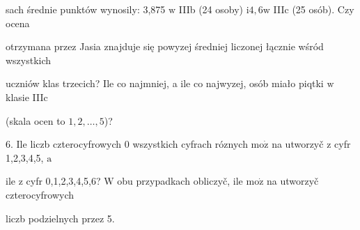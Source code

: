 \documentclass[a4paper,12pt]{article}
\begin{document}
sach średnie punktów wynosily: 3,875 $\mathrm{w}$ IIIb (24 osoby) $\mathrm{i}4,6\mathrm{w}$ IIIc (25 osób). Czy ocena

otrzymana przez Jasia znajduje się powyzej średniej liczonej łącznie wśród wszystkich

uczniów klas trzecich? Ile co najmniej, a ile co najwyzej, osób miało piqtki $\mathrm{w}$ klasie IIIc

(skala ocen to $1,2,\ldots,5$)?

6. Ile liczb czterocyfrowych $0$ wszystkich cyfrach róznych $\mathrm{m}\mathrm{o}\dot{\mathrm{z}}$ na utworzyč $\mathrm{z}$ cyfr 1,2,3,4,5, $\mathrm{a}$

ile $\mathrm{z}$ cyfr 0,1,2,3,4,5,6? $\mathrm{W}$ obu przypadkach obliczyč, ile $\mathrm{m}\mathrm{o}\dot{\mathrm{z}}$ na utworzyč czterocyfrowych

liczb podzielnych przez 5.
\end{document}
